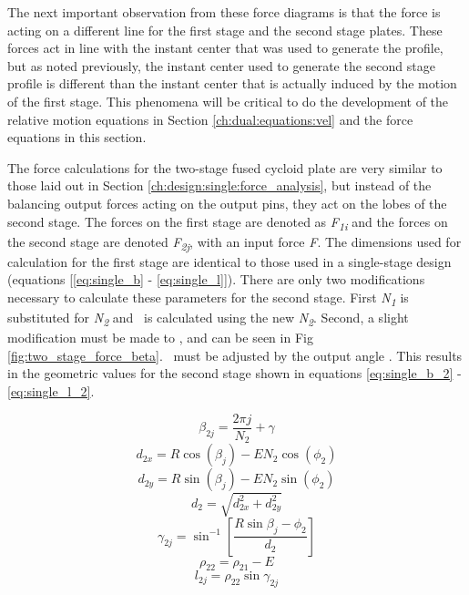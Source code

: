 The next important observation from these force diagrams is that the force is acting on a different line for the first stage and the second stage plates. These forces act in line with the instant center that was used to generate the profile, but as noted previously, the instant center used to generate the second stage profile is different than the instant center that is actually induced by the motion of the first stage. This phenomena will be critical to do the development of the relative motion equations in Section \ref{ch:dual:equations:vel} and the force equations in this section. 

The force calculations for the two-stage fused cycloid plate are very similar to those laid out in Section \ref{ch:design:single:force_analysis}, but instead of the balancing output forces acting on the output pins, they act on the lobes of the second stage. The forces on the first stage are denoted as \textit{F\textsubscript{1i}} and the forces on the second stage are denoted \textit{F\textsubscript{2j}}, with an input force \textit{F}. The dimensions used for calculation for the first stage are identical to those used in a single-stage design (equations [\ref{eq:single_b} - \ref{eq:single_l}]). There are only two modifications necessary to calculate these parameters for the second stage. First \textit{N\textsubscript{1}} is substituted for \textit{N\textsubscript{2}} and \textrho\ is calculated using the new \textit{N\textsubscript{2}}. Second, a slight modification must be made to \textbeta, and can be seen in Fig \ref{fig:two_stage_force_beta}. \textbeta\ must be adjusted by the output angle \textalpha. This results in the geometric values for the second stage shown in equations \ref{eq:single_b_2} - \ref{eq:single_l_2}.

\begin{equation} \label{eq:single_b_2}
\beta_{2j} = \frac{2\pi j}{N_2} + \gamma
\end{equation}
\begin{equation} \label{eq:single_d:x_2}
d_{2x} = R \cos(\beta_j) - E N_2 \cos(\phi_2)
\end{equation}
\begin{equation} \label{eq:single_d:y_2}
d_{2y} = R\sin(\beta_j) - E N_2 \sin(\phi_2)
\end{equation}
\begin{equation} \label{eq:single_d_2}
d_2 = \sqrt{d_{2x}^2 + d_{2y}^2}
\end{equation}
\begin{equation} \label{eq:single_gamma_2}
\gamma_{2j} = \sin^{-1}\left[{\frac{R \sin{\beta_j - \phi_2}}{d_2}}\right]
\end{equation}
\begin{equation} \label{eq:single_rho2_2}
\rho_{22} = \rho_{21} - E
\end{equation}
\begin{equation} \label{eq:single_l_2}
l_{2j} = \rho_{22} \sin{\gamma_{2j}}
\end{equation}


